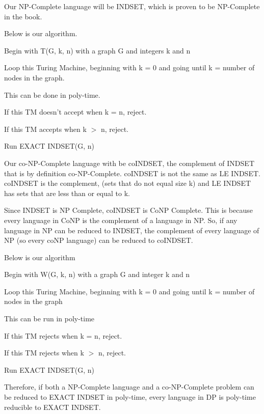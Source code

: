 \documentclass[12pt]{article}
\begin{document}
Our NP-Complete language will be INDSET, which is proven to be NP-Complete in the book.

Below is our algorithm.

Begin with T(G, k, n) with a graph G and integers k and n

Loop this Turing Machine, beginning with k = 0 and going until k = number of nodes in the graph.

This can be done in poly-time.

If this TM doesn't accept when k = n, reject.

If this TM accepts when k $>$ n, reject.

Run EXACT INDSET(G, n) 

Our co-NP-Complete language with be coINDSET, 
the complement of INDSET that is by definition 
co-NP-Complete. coINDSET is not the same 
as LE INDSET. coINDSET is the complement, (sets 
that do not equal size k) and LE INDSET has sets
that are less than or equal to k. 

Since INDSET is NP Complete, coINDSET is CoNP 
Complete. This is because every language in CoNP
is the complement of a language in NP. So, 
if any language in NP can be reduced to INDSET,
the complement of every language of NP (so every 
coNP language) can be reduced
to coINDSET. 



Below is our algorithm

Begin with W(G, k, n) with a graph G and integer k and n

Loop this Turing Machine, beginning with k = 0 and going until k = number of nodes in the graph

This can be run in poly-time

If this TM rejects when k = n, reject.

If this TM rejects when k $>$ n, reject.

Run EXACT INDSET(G, n)

Therefore, if both a NP-Complete language and a co-NP-Complete problem can be reduced to EXACT INDSET in
poly-time, every language in DP is poly-time reducible to EXACT INDSET.
\end{document}
